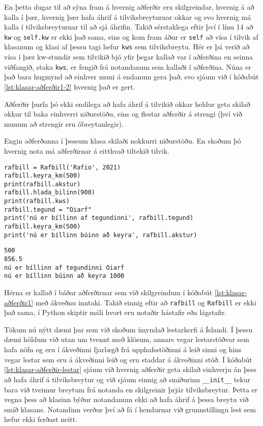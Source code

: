 En þetta dugar til að sýna fram á hvernig aðferðir eru skilgreindar, hvernig á að kalla í þær, hvernig þær hafa áhrif á tilviksbreyturnar okkar og svo hvernig má kalla í tilviksbreyturnar til að sjá áhrifin.
Takið sérstaklega eftir því í línu 14 að \texttt{kw} og \texttt{self.kw} er ekki það sama, eins og kom fram áður er \texttt{self} að vísa í tilvik af klasanum og klasi af þessu tagi hefur \texttt{kws} sem tilviksbreytu.
Hér er þá verið að vísa í þær kw-stundir sem tilvikið bjó yfir þegar kallað var í aðferðina en seinna viðfangið, staka \texttt{kws}, er fengið frá notandanum sem kallaði í aðferðina.
Núna er það bara hugmynd að einhver muni á endanum gera það, svo sjáum við í kóðabút \ref{lst:klasar-aðferðir1-2} hvernig það er gert.

Aðferðir þurfa þó ekki endilega að hafa áhrif á tilvikið okkar heldur geta skilað okkur til baka einhverri niðurstöðu, eins og flestar aðferðir á strengi (því við munum að strengir eru óbreytanlegir).

Engin aðferðanna í þessum klasa skilaði nokkurri niðurstöðu.
En skoðum þó hvernig nota má aðferðirnar á eitthvað tiltekið tilvik.

\begin{lstlisting}[caption=Tilvik af rafbílaklasanum búið til og notað, label=lst:klasar-aðferðir1-2]
rafbill = Rafbill('Rafio', 2021) 
rafbill.keyra_km(500)
print(rafbill.akstur) 
rafbill.hlada_bilinn(900)
print(rafbill.kws)
rafbill.tegund = "Oiarf"
print('nú er bíllinn af tegundinni', rafbill.tegund)
rafbill.keyra_km(500)
print('nú er bíllinn búinn að keyra', rafbill.akstur)
\end{lstlisting}
\lstset{style=uttak}
\begin{lstlisting}
500
856.5
nú er bíllinn af tegundinni Oiarf
nú er bíllinn búinn að keyra 1000
\end{lstlisting}
\lstset{style=venjulegt}

Hérna er kallað í báðar aðferðirnar sem við skilgreindum í kóðabút \ref{lst:klasar-aðferðir1} með ákveðnu inntaki.
Takið einnig eftir að \texttt{rafbill} og \texttt{Rafbill} er ekki það sama, í Python skiptir máli hvort eru notaðir hástafir eða lágstafir. 

Tökum nú nýtt dæmi þar sem við skoðum ímyndað lestarkerfi á Íslandi.
Í þessu dæmi höldum við utan um tvennt með klösum, annars vegar lestarstöðvar sem hafa nöfn og eru í ákveðinni fjarlægð frá upphafsstöðinni á leið sinni og hins vegar lestar sem eru á ákveðinni leið og eru staddar á ákveðinni stöð.
Í kóðabút \ref{lst:klasar-aðferðir-lestar} sjáum við hvernig aðferðir geta skilað einhverju án þess að hafa áhrif á tilviksbreytur og við sjáum einnig að smiðurinn \texttt{\_\_init\_\_} tekur bara við tveimur breytum frá notanda en skilgreinir þrjár tilviksbreytur.
Þetta er vegna þess að klasinn býður notandanum ekki að hafa áhrif á þessa breytu við smíð klasans.
Notandinn verður því að fá í hendurnar við grunnstillingu lest sem hefur ekki ferðast neitt.

